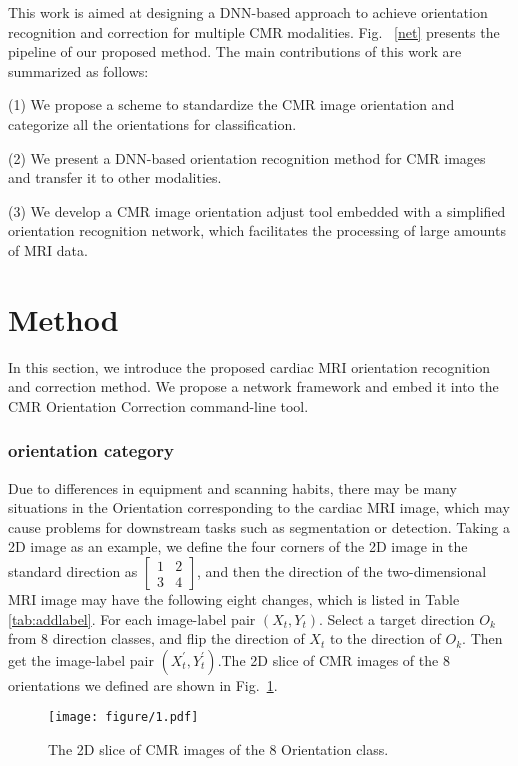 \documentclass[runningheads]{llncs}
\begin{document}
This work is aimed at designing a DNN-based approach to achieve orientation recognition and correction for multiple CMR modalities. Fig. ~\ref{net} presents the pipeline of our proposed method. The main contributions of this work are summarized as follows:

(1) We propose a scheme to standardize the CMR image orientation and categorize all the orientations for classification.

(2) We present a DNN-based orientation recognition method for CMR images and transfer it to other modalities.

(3) We develop a CMR image orientation adjust tool embedded with a simplified orientation recognition network, which facilitates the processing of large amounts of MRI data.




\section{Method}

In this section, we introduce the proposed cardiac MRI orientation recognition and correction method. We propose a network framework and embed it into the CMR Orientation Correction command-line tool.

\subsubsection{orientation category}

Due to differences in equipment and scanning habits, there may be many situations in the Orientation corresponding to the cardiac MRI image, which may cause problems for downstream tasks such as segmentation or detection. Taking a 2D image as an example, we define the four corners of the 2D image in the standard direction as $\begin{bmatrix} 1 & 2 \\ 3 & 4 \end{bmatrix}$, and then the direction of the two-dimensional MRI image may have the following eight changes, which is listed in Table \ref{tab:addlabel}. For each image-label pair $(X_t, Y_t)$. Select a target direction $O_k$ from 8 direction classes, and flip the direction of $X_t$ to the direction of $O_k$. Then get the image-label pair $(X_t^{'}, Y_t^{'})$.The 2D slice of CMR images of the 8 orientations we defined are shown in Fig.~\ref{class}.



\begin{figure}
\texttt{[image: figure/1.pdf]}
\caption{The 2D slice of CMR images of the 8 Orientation class.} \label{class}
\end{figure}
\end{document}
